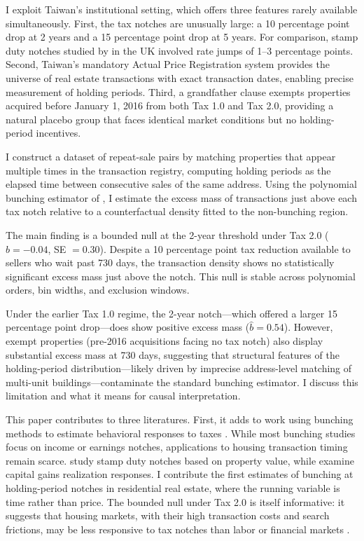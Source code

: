 \documentclass[12pt]{article}
\begin{document}
I exploit Taiwan's institutional setting, which offers three features rarely available simultaneously. First, the tax notches are unusually large: a 10 percentage point drop at 2 years and a 15 percentage point drop at 5 years. For comparison, stamp duty notches studied by \citet{best2018} in the UK involved rate jumps of 1--3 percentage points. Second, Taiwan's mandatory Actual Price Registration system provides the universe of real estate transactions with exact transaction dates, enabling precise measurement of holding periods. Third, a grandfather clause exempts properties acquired before January 1, 2016 from both Tax 1.0 and Tax 2.0, providing a natural placebo group that faces identical market conditions but no holding-period incentives.

I construct a dataset of repeat-sale pairs by matching properties that appear multiple times in the transaction registry, computing holding periods as the elapsed time between consecutive sales of the same address. Using the polynomial bunching estimator of \citet{kleven2013}, I estimate the excess mass of transactions just above each tax notch relative to a counterfactual density fitted to the non-bunching region.

The main finding is a bounded null at the 2-year threshold under Tax 2.0 ($\hat{b}=-0.04$, SE $= 0.30$). Despite a 10 percentage point tax reduction available to sellers who wait past 730 days, the transaction density shows no statistically significant excess mass just above the notch. This null is stable across polynomial orders, bin widths, and exclusion windows.

Under the earlier Tax 1.0 regime, the 2-year notch---which offered a larger 15 percentage point drop---does show positive excess mass ($\hat{b}=0.54$). However, exempt properties (pre-2016 acquisitions facing no tax notch) also display substantial excess mass at 730 days, suggesting that structural features of the holding-period distribution---likely driven by imprecise address-level matching of multi-unit buildings---contaminate the standard bunching estimator. I discuss this limitation and what it means for causal interpretation.

This paper contributes to three literatures. First, it adds to work using bunching methods to estimate behavioral responses to taxes \citep{saez2010, chetty2011, kleven2013, kleven2016, blomquist2021, gelber2020}. While most bunching studies focus on income or earnings notches, applications to housing transaction timing remain scarce. \citet{best2018} study stamp duty notches based on property value, while \citet{kopczuk2016} examine capital gains realization responses. I contribute the first estimates of bunching at holding-period notches in residential real estate, where the running variable is time rather than price. The bounded null under Tax 2.0 is itself informative: it suggests that housing markets, with their high transaction costs and search frictions, may be less responsive to tax notches than labor or financial markets \citep{slemrod2013}.
\end{document}
